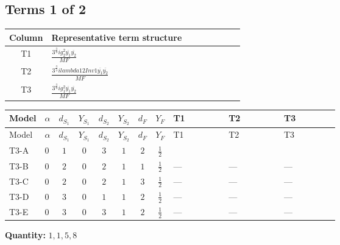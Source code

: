 \documentclass[8pt]{article}
\begin{document}
\begin{landscape}
\subsection*{Terms 1 of 2}
\begin{center}
\begin{tabular}{@{}c >{\raggedright\arraybackslash}p{0.82\linewidth}@{}}
\toprule
Column & Representative term structure \\
\midrule
T1 & \(\displaystyle \frac{3^{\frac{3}{4}} i g_{2}^{2} \overline{y_{1}} \overline{y_{2}}}{MF}\) \\
\midrule
T2 & \(\displaystyle \frac{3^{\frac{3}{4}} i lambda12Inv1 \overline{y_{1}} \overline{y_{2}}}{MF}\) \\
\midrule
T3 & \(\displaystyle \frac{3^{\frac{3}{4}} i g_{1}^{2} \overline{y_{1}} \overline{y_{2}}}{MF}\) \\
\midrule
\bottomrule
\end{tabular}
\end{center}
\smallskip
\tiny
\begin{longtable}{@{}llcccccc >{\raggedright\arraybackslash}p{0.21\linewidth} >{\raggedright\arraybackslash}p{0.21\linewidth} >{\raggedright\arraybackslash}p{0.21\linewidth}@{}}
\toprule
Model & $\alpha$ & $d_{S_1}$ & $Y_{S_1}$ & $d_{S_2}$ & $Y_{S_2}$ & $d_F$ & $Y_F$ & T1 & T2 & T3 \\
\midrule
\endfirsthead
\toprule
Model & $\alpha$ & $d_{S_1}$ & $Y_{S_1}$ & $d_{S_2}$ & $Y_{S_2}$ & $d_F$ & $Y_F$ & T1 & T2 & T3 \\
\midrule
\endhead
T3-A & $0$ & $1$ & $0$ & $3$ & $1$ & $2$ & $\frac{1}{2}$ & \scriptsize\adjustbox{max width=\linewidth}{$\begin{gathered} - \frac{11 \cdot 3^{\frac{3}{4}} i g_{2}^{2} \overline{y_{1}} \overline{y_{2}}}{8 MF}\end{gathered}$} & \scriptsize\adjustbox{max width=\linewidth}{$\begin{gathered} - \frac{3^{\frac{3}{4}} i lambda12Inv1 \overline{y_{1}} \overline{y_{2}}}{6 MF}\end{gathered}$} & \scriptsize\adjustbox{max width=\linewidth}{$\begin{gathered} - \frac{3^{\frac{3}{4}} i g_{1}^{2} \overline{y_{1}} \overline{y_{2}}}{8 MF}\end{gathered}$} \\
\midrule
T3-B & $0$ & $2$ & $0$ & $2$ & $1$ & $1$ & $\frac{1}{2}$ & --- & --- & --- \\
\midrule
T3-C & $0$ & $2$ & $0$ & $2$ & $1$ & $3$ & $\frac{1}{2}$ & --- & --- & --- \\
\midrule
T3-D & $0$ & $3$ & $0$ & $1$ & $1$ & $2$ & $\frac{1}{2}$ & --- & --- & --- \\
\midrule
T3-E & $0$ & $3$ & $0$ & $3$ & $1$ & $2$ & $\frac{1}{2}$ & --- & --- & --- \\
\midrule
\bottomrule
\end{longtable}
\clearpage
\noindent\textbf{Quantity: }$\mathrm{1,1,5,8}$\par\smallskip

\end{landscape}
\end{document}
